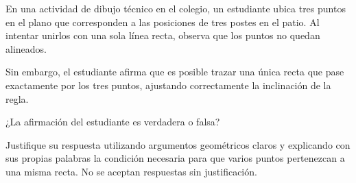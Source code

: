 En una actividad de dibujo técnico en el colegio, un estudiante ubica tres puntos en el plano que corresponden a las posiciones de tres postes en el patio. Al intentar unirlos con una sola línea recta, observa que los puntos no quedan alineados.

Sin embargo, el estudiante afirma que es posible trazar una única recta que pase exactamente por los tres puntos, ajustando correctamente la inclinación de la regla.

¿La afirmación del estudiante es verdadera o falsa?

Justifique su respuesta utilizando argumentos geométricos claros y explicando con sus propias palabras la condición necesaria para que varios puntos pertenezcan a una misma recta. No se aceptan respuestas sin justificación.